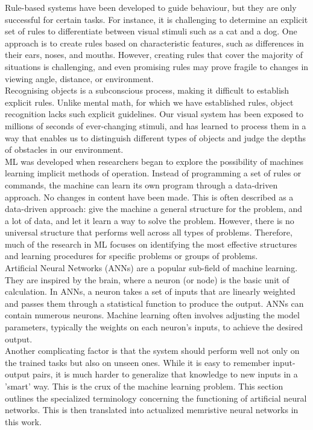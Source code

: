 \noindent Rule-based systems have been developed to guide behaviour, but they are only successful for certain tasks. For instance, it is challenging to determine an explicit set of rules to differentiate between visual stimuli such as a cat and a dog. One approach is to create rules based on characteristic features, such as differences in their ears, noses, and mouths. However, creating rules that cover the majority of situations is challenging, and even promising rules may prove fragile to changes in viewing angle, distance, or environment. \\

\noindent Recognising objects is a subconscious process, making it difficult to establish explicit rules. Unlike mental math, for which we have established rules, object recognition lacks such explicit guidelines. Our visual system has been exposed to millions of seconds of ever-changing stimuli, and has learned to process them in a way that enables us to distinguish different types of objects and judge the depths of obstacles in our environment. \\

\noindent ML was developed when researchers began to explore the possibility of machines learning implicit methods of operation. Instead of programming a set of rules or commands, the machine can learn its own program through a data-driven approach. No changes in content have been made. This is often described as a data-driven approach: give the machine a general structure for the problem, and a lot of data, and let it learn a way to solve the problem. However, there is no universal structure that performs well across all types of problems. Therefore, much of the research in ML focuses on identifying the most effective structures and learning procedures for specific problems or groups of problems. \\

\noindent Artificial Neural Networks (ANNs) are a popular sub-field of machine learning. They are inspired by the brain, where a neuron (or node) is the basic unit of calculation. In ANNs, a neuron takes a set of inputs that are linearly weighted and passes them through a statistical function to produce the output. ANNs can contain numerous neurons. Machine learning often involves adjusting the model parameters, typically the weights on each neuron's inputs, to achieve the desired output. \\

\noindent Another complicating factor is that the system should perform well not only on the trained tasks but also on unseen ones.   While it is easy to remember input-output pairs, it is much harder to generalize that knowledge to new inputs in a 'smart' way. This is the crux of the machine learning problem. This section outlines the specialized terminology concerning the functioning of artificial neural networks. This is then translated into actualized memristive neural networks in this work. 

